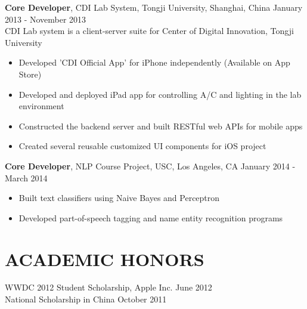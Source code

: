 \documentclass[line, overlapped]{res}
\begin{document}
\begin{resume}
\textbf{Core Developer}, CDI Lab System, Tongji University, Shanghai, China \hfill January 2013 - November 2013\\
CDI Lab system is a client-server suite for Center of Digital Innovation, Tongji University
\begin{itemize} \itemsep -2pt %

  \item Developed 'CDI Official App' for iPhone independently (Available on App Store)
  
  \item Developed and deployed iPad app for controlling A/C and lighting in the lab environment
  
  \item Constructed the backend server and built RESTful web APIs for mobile apps

  \item Created several reusable customized UI components for iOS project

\end{itemize}

\textbf{Core Developer}, NLP Course Project, USC, Los Angeles, CA \hfill  January 2014 - March 2014
\begin{itemize} \itemsep -2pt %

  \item Built text classifiers using Naive Bayes and Perceptron

  \item Developed part-of-speech tagging and name entity recognition programs

\end{itemize}

\section{ACADEMIC HONORS}
WWDC 2012 Student Scholarship, Apple Inc. \hfill June 2012 \\
National Scholarship in China \hfill October 2011\\

\end{resume}
\end{document}
